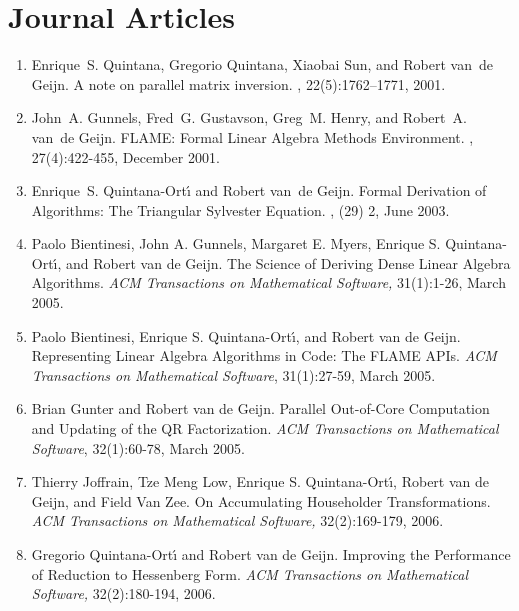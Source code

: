 \section{Journal Articles}

\renewcommand\labelenumi{J\theenumi}

\begin{enumerate}
\item
Enrique~S. Quintana, Gregorio Quintana, Xiaobai Sun, and Robert van~de Geijn.
\newblock A note on parallel matrix inversion.
, 22(5):1762--1771, 2001.

\item
John~A. Gunnels, Fred~G. Gustavson, Greg~M. Henry, and Robert~A. van~de Geijn.
\newblock 
FLAME: Formal Linear Algebra Methods Environment.
, 
27(4):422-455, December 2001.

\item
Enrique~S. Quintana-Ort\'{\i} and Robert van~de Geijn.
\newblock 
Formal Derivation of Algorithms: The Triangular Sylvester Equation.
, 
(29) 2, June 2003.

\item
Paolo Bientinesi, John A. Gunnels, Margaret E. Myers, Enrique S. Quintana-Ort\'{\i}, and Robert van de Geijn.
\newblock
The Science of Deriving Dense Linear Algebra Algorithms.
{\em ACM Transactions on Mathematical Software,} 
31(1):1-26, March 2005.

\item
Paolo Bientinesi, Enrique S. Quintana-Ort\'{\i}, and Robert van de Geijn.
\newblock
Representing Linear Algebra Algorithms in Code: The FLAME APIs. 
{\em ACM Transactions on Mathematical Software}, 31(1):27-59, March 2005.

\item
Brian Gunter and Robert van de Geijn. 
\newblock
Parallel Out-of-Core Computation and Updating of the QR Factorization. 
{\em ACM Transactions on Mathematical Software}, 32(1):60-78, March 2005.

\item
Thierry Joffrain, Tze Meng Low, Enrique S. Quintana-Ort\'{\i}, Robert van de Geijn, and Field Van Zee.
\newblock
On Accumulating Householder Transformations.
{\em ACM Transactions on Mathematical Software,}
 32(2):169-179, 2006.

\item
Gregorio Quintana-Ort\'{\i} and Robert van de Geijn.
\newblock
Improving the Performance of Reduction to Hessenberg Form.
{\em ACM Transactions on Mathematical Software,} 32(2):180-194, 2006.


\end{enumerate}
